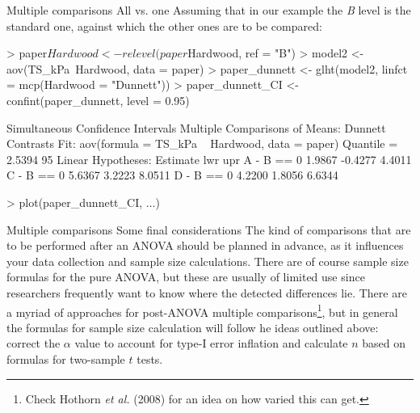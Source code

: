\documentclass[t]{beamer}
\begin{document}
\begin{ftstf}
{Multiple comparisons}
{All vs. one}
Assuming that in our example the \textit{B} level is the standard one, against which the other ones are to be compared:
\vhalf
\begin{rcode}
> paper$Hardwood   <- relevel(paper$Hardwood, ref = "B")
> model2           <- aov(TS_kPa~Hardwood, data = paper)
> paper_dunnett    <- glht(model2, linfct = mcp(Hardwood = "Dunnett"))
> paper_dunnett_CI <- confint(paper_dunnett, level = 0.95)

Simultaneous Confidence Intervals
Multiple Comparisons of Means: Dunnett Contrasts
Fit: aov(formula = TS_kPa ~ Hardwood, 
         data = paper)
Quantile = 2.5394
95%
Linear Hypotheses:
           Estimate lwr     upr    
A - B == 0  1.9867  -0.4277  4.4011
C - B == 0  5.6367   3.2223  8.0511
D - B == 0  4.2200   1.8056  6.6344

> plot(paper_dunnett_CI, ...)
\end{rcode}
\end{ftstf}


\begin{ftst}
{Multiple comparisons}
{Some final considerations}
The kind of comparisons that are to be performed after an ANOVA should be planned in advance, as it influences your data collection and sample size calculations. There are of course sample size formulas for the pure ANOVA, but these are usually of limited use since researchers frequently want to know where the detected differences lie.
\vone
There are a myriad of approaches for post-ANOVA multiple comparisons\footnote[5]{\tiny Check Hothorn \textit{et al.} (2008) for an idea on how varied this can get.}, but in general the formulas for sample size calculation will follow he ideas outlined above: correct the $\alpha$ value to account for type-I error inflation and calculate $n$ based on formulas for two-sample $t$ tests. 
\end{ftst}
\end{document}
